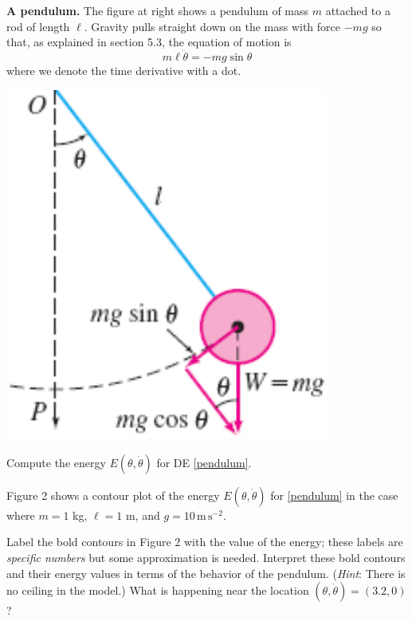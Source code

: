 \documentclass[12pt]{article}
\theoremstyle{definition}
\begin{document}
\medskip
\begin{minipage}[t]{0.65\textwidth}
\textbf{A pendulum.}  The figure at right shows a pendulum of mass $m$ attached to a rod of length $\ell$.  Gravity pulls straight down on the mass with force $-mg$ so that, as explained in section 5.3, the equation of motion is
\begin{equation}
m \ell \ddot{\theta} = -m g \sin\theta  \label{pendulum}
\end{equation}
where we denote the time derivative with a dot.

\end{minipage}
\begin{minipage}[t]{0.35\textwidth}
\vspace{0pt}

\hfill \includegraphics[width=0.8\textwidth]{figs/pendulum}
\end{minipage}

\begin{exerpart}
Compute the energy $E(\theta,\dot\theta)$ for DE \eqref{pendulum}.
\end{exerpart}

Figure 2 shows a contour plot of the energy $E(\theta,\dot\theta)$ for \eqref{pendulum} in the case where $m=1$ kg, $\ell=1$ m, and $g=10 \, \text{m}\,\text{s}^{-2}$. 

\begin{exerpart}
Label the bold contours in Figure 2 with the value of the energy; these labels are \emph{specific numbers} but some approximation is needed.  Interpret these bold contours and their energy values in terms of the behavior of the pendulum.  (\emph{Hint}:  There is no ceiling in the model.)  What is happening near the location $(\theta,\dot\theta)=(3.2,0)$?
\end{exerpart}
\end{document}
